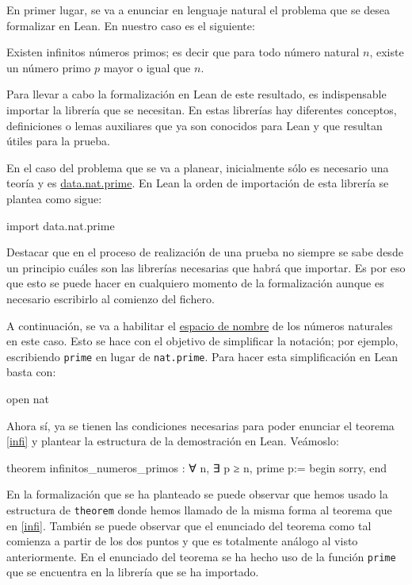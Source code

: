 En primer lugar, se va a enunciar en lenguaje natural el problema que se
desea formalizar en Lean. En nuestro caso es el siguiente:

\begin{teorema}\label{infi}
  Existen infinitos números primos; es decir que para todo número
  natural \(n\), existe un número primo \(p\) mayor o igual que
  \(n\).
\end{teorema}

Para llevar a cabo la formalización en Lean de este resultado, es
indispensable importar la librería que se necesitan. En estas
librerías hay diferentes conceptos, definiciones o lemas auxiliares que
ya son conocidos para Lean y que resultan útiles para la prueba.

En el caso del problema que se va a planear, inicialmente sólo es necesario
una teoría y es
\href{https://github.com/leanprover-community/mathlib/blob/master/src/data/nat/prime.lean}
{data.nat.prime}. En Lean la orden de importación de esta librería se plantea
como sigue:
\begin{leancode}
import data.nat.prime
\end{leancode}

\begin{nota}
  Destacar que en el proceso de realización de una prueba no siempre se sabe
  desde un principio cuáles son las librerías necesarias que habrá que importar.
  Es por eso que esto se puede hacer en cualquiero momento de la formalización
  aunque es necesario escribirlo al comienzo del fichero.
\end{nota}

A continuación, se va a habilitar el
\href{https://leanprover.github.io/reference/other_commands.html#namespaces}
{espacio de nombre} de los números naturales en este caso. Esto se hace
con el objetivo de simplificar la notación; por ejemplo, escribiendo
\texttt{prime} en lugar de \texttt{nat.prime}. Para hacer esta
simplificación en Lean basta con:
\begin{leancode}
open nat
\end{leancode}

Ahora sí, ya se tienen las condiciones necesarias para poder enunciar el
teorema \ref{infi} y plantear la estructura de la demostración en Lean.
Veámoslo:
\begin{leancode}
theorem infinitos_numeros_primos : ∀ n, ∃ p ≥ n, prime p:=
begin
  sorry,
end
\end{leancode}

En la formalización que se ha planteado se puede observar que hemos usado la
estructura de \texttt{theorem} donde hemos llamado de la misma forma al
teorema que en \ref{infi}. También se puede observar que el enunciado del
teorema como tal comienza a partir de los dos puntos y que es totalmente
análogo al visto anteriormente. En el enunciado del teorema se ha hecho uso
de la función \texttt{prime} que se encuentra en la librería que se ha
importado.


